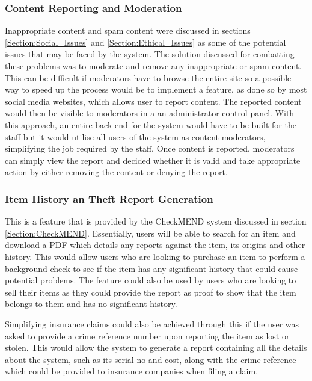 \subsubsection{Content Reporting and Moderation}
Inappropriate content and spam content were discussed in sections \ref{Section:Social_Issues} and \ref{Section:Ethical_Issues} as some of the potential issues that may be faced by the system. The solution discussed for combatting these problems was to moderate and remove any inappropriate or spam content. This can be difficult if moderators have to browse the entire site so a possible way to speed up the process would be to implement a feature, as done so by most social media websites, which allows user to report content. The reported content would then be visible to moderators in a an administrator control panel. With this approach, an entire back end for the system would have to be built for the staff but it would utilise all users of the system as content moderators, simplifying the job required by the staff. Once content is reported, moderators can simply view the report and decided whether it is valid and take appropriate action by either removing the content or denying the report.

\subsubsection{Item History an Theft Report Generation}
This is a feature that is provided by the CheckMEND system discussed in section \ref{Section:CheckMEND}\cite{CheckMEND:Home}. Essentially, users will be able to search for an item and download a PDF which details any reports against the item, its origins and other history. This would allow users who are looking to purchase an item to perform a background check to see if the item has any significant history that could cause potential problems. The feature could also be used by users who are looking to sell their items as they could provide the report as proof to show that the item belongs to them and has no significant history. 

Simplifying insurance claims could also be achieved through this if the user was asked to provide a crime reference number upon reporting the item as lost or stolen. This would allow the system to generate a report containing all the details about the system, such as its serial no and cost, along with the crime reference which could be provided to insurance companies when filing a claim.


